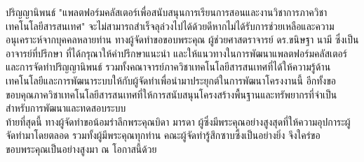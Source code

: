 \hspace*{1.5em}  %
ปริญญานิพนธ์ "แพลตฟอร์มคลัสเตอร์เพื่อสนับสนุนการเรียนการสอนและงานวิชาการภาควิชาเทคโนโลยีสารสนเทศ" จะไม่สามารถสำเร็จลุล่วงไปได้ด้วยดีหากไม่ได้รับการช่วยเหลือและความอนุเคราะห์จากบุคคลหลายท่าน ทางผู้จัดทำขอขอบพระคุณ ผู้ช่วยศาสตราจารย์ ดร.ขนิษฐา นามี ซึ่งเป็นอาจารย์ที่ปรึกษา ที่ได้กรุณาให้คำปรึกษาแนะนำ และให้แนวทางในการพัฒนาแพลตฟอร์มคลัสเตอร์และการจัดทำปริญญานิพนธ์ รวมทั้งคณาจารย์ภาควิชาเทคโนโลยีสารสนเทศที่ได้ให้ความรู้ด้านเทคโนโลยีและการพัฒนาระบบให้กับผู้จัดทำเพื่อนำมาประยุกต์ในการพัฒนาโครงงานนี้ อีกทั้งขอขอบคุณภาควิชาเทคโนโลยีสารสนเทศที่ให้การสนับสนุนโครงสร้างพื้นฐานและทรัพยากรที่จำเป็นสำหรับการพัฒนาและทดสอบระบบ 
\\
\hspace*{1.5em}  %
ท้ายที่สุดนี้ ทางผู้จัดทำขอน้อมรำลึกพระคุณบิดา มารดา ผู้ซึ่งมีพระคุณอย่างสูงสุดที่ให้ความอุปการะผู้จัดทำมาโดยตลอด รวมทั้งผู้มีพระคุณทุกท่าน คณะผู้จัดทำรู้สึกซาบซึ้งเป็นอย่างยิ่ง จึงใคร่ขอขอบพระคุณเป็นอย่างสูงมา ณ โอกาสนี้ด้วย
\\
\begin{flushright}

\end{flushright}